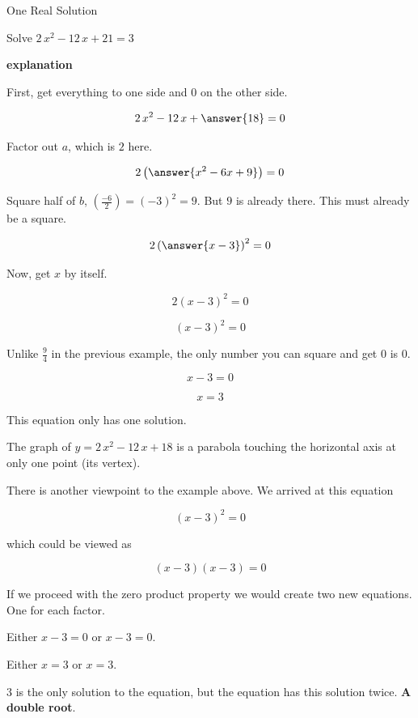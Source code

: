 \documentclass{ximera}
\begin{document}
\begin{example} One Real Solution

Solve $2 \, x^2 - 12 \, x + 21 = 3$ 


\textbf{\textcolor{red!75!green}{explanation}} 


First, get everything to one side and $0$ on the other side.



\[  2 \, x^2 - 12 \, x + \answer{18} = 0  \]

Factor out $a$, which is $2$ here.

\[  2 \left( \answer{x^2 - 6x + 9} \right) = 0  \]


Square half of $b$, $\left(\frac{-6}{2}\right) = (-3)^2 = 9$.  But $9$ is already there.  This must already be a square.



\[  2 \left( \answer{x - 3} \right)^2 = 0  \]


Now, get $x$ by itself.

\[  2 (x - 3)^2 = 0  \]

\[  (x - 3)^2 = 0  \]


Unlike $\frac{9}{4}$ in the previous example, the only number you can square and get $0$ is $0$.

\[  x - 3 = 0  \]

\[  x = 3  \]


This equation only has one solution.



\end{example}



The graph of $y = 2 \, x^2 - 12\, x + 18$ is a parabola touching the horizontal axis at only one point (its vertex).





There is another viewpoint to the example above.  We arrived at this equation

\[  (x - 3)^2 = 0  \]

which could be viewed as 

\[  (x - 3) (x - 3) = 0  \]


If we proceed with the zero product property we would create two new equations.  One for each factor.

Either $x - 3 = 0$   or $x - 3 = 0$. 

Either $x = 3$ or $x = 3$.  

$3$ is the only solution to the equation, but the equation has this solution twice. \textbf{\textcolor{red!70!black}{A double root}}.
\end{document}
